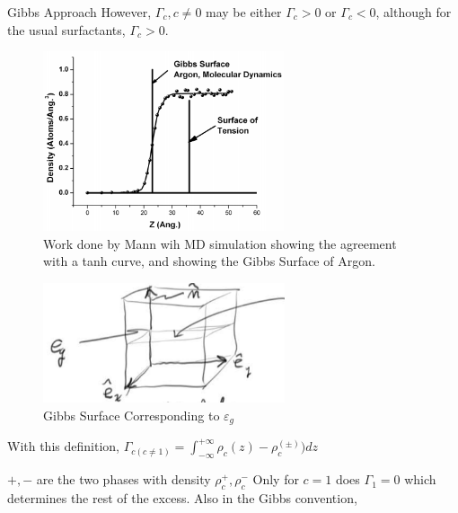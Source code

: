 \documentclass{article}
\begin{document}
\begin{section}{Gibbs Approach}
	However, $\Gamma_c, c\neq 0$ may be either $\Gamma_c > 0$ or $\Gamma_c < 0$, although for the usual surfactants, $\Gamma_c > 0$.
	\begin{figure}[h]
		\centering
		\includegraphics[height=150pt]{GibbsSurface}
		\caption{Work done by Mann wih MD simulation showing the agreement with a tanh curve, and showing the Gibbs Surface of Argon.}
		\label{fig:Gibbs Surface Detail}
	\end{figure}
\end{section}
\begin{section}{}
	\begin{figure}[h]
		\centering
		\includegraphics[height=100pt]{GibbsSurfaceToEg}
		\caption{Gibbs Surface Corresponding to $\varepsilon_g$}
		\label{fig:Gibbs Surface EgBox}
	\end{figure}
	With this definition, $\Gamma_{c(c\neq 1)} = \int_{-\infty}^{+\infty} \rho_c(z) - \rho_c^(\pm) ) dz$

	$+, - $ are the two phases with density $\rho_c^+, \rho_c^-$
	Only for $c=1$ does $\Gamma_1 = 0$ which determines the rest of the excess. Also in the Gibbs convention, 

\end{section}
\end{document}
